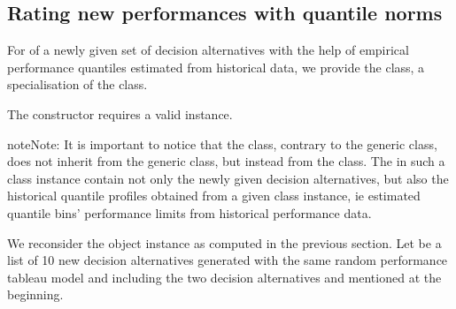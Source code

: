 \documentclass[a4paper,10pt,english]{sphinxhowto}
\begin{document}
\subsection{Rating new performances with quantile norms}
\label{\detokenize{tutorial:rating-new-performances-with-quantile-norms}}
For  of a newly given set of decision alternatives with the help of empirical performance quantiles estimated from historical data, we provide the  class, a specialisation of the  class.

The constructor requires a valid  instance.

\begin{sphinxadmonition}{note}{Note:}
It is important to notice that the  class, contrary to the generic  class, does not inherit from the generic  class, but instead from the  class. The  in such a  class instance contain not only the newly given decision alternatives, but also the historical quantile profiles obtained from a given  class instance, ie estimated quantile bins’ performance limits from historical performance data.
\end{sphinxadmonition}

We reconsider the  object instance  as computed in the previous section. Let  be a list of 10 new decision alternatives generated with the same random performance tableau model and including the two decision alternatives  and  mentioned at the beginning.
\end{document}
